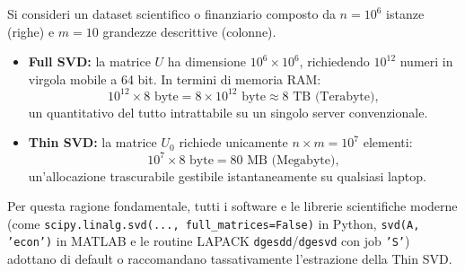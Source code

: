 \begin{table}[H]
\centering
{}
\caption{Confronto asintotico di occupazione spaziale e costo temporale tra Full SVD e Thin SVD.}
\label{tab:svd-full-vs-thin-complessita}
\end{table}

\begin{example}
Si consideri un dataset scientifico o finanziario composto da $n = 10^6$ istanze (righe) e $m = 10$ grandezze descrittive (colonne).
\begin{itemize}
    \item \textbf{Full SVD:} la matrice $U$ ha dimensione $10^6 \times 10^6$, richiedendo $10^{12}$ numeri in virgola mobile a 64 bit. In termini di memoria RAM:
    \begin{equation}
        10^{12} \times 8 \text{ byte} = 8 \times 10^{12} \text{ byte} \approx 8 \text{ TB (Terabyte)},
    \end{equation}
    un quantitativo del tutto intrattabile su un singolo server convenzionale.
    \item \textbf{Thin SVD:} la matrice $U_0$ richiede unicamente $n \times m = 10^7$ elementi:
    \begin{equation}
        10^7 \times 8 \text{ byte} = 80 \text{ MB (Megabyte)},
    \end{equation}
    un'allocazione trascurabile gestibile istantaneamente su qualsiasi laptop.
\end{itemize}
Per questa ragione fondamentale, tutti i software e le librerie scientifiche moderne (come \texttt{scipy.linalg.svd(..., full\_matrices=False)} in Python, \texttt{svd(A, 'econ')} in MATLAB e le routine LAPACK \texttt{dgesdd}/\texttt{dgesvd} con job \texttt{'S'}) adottano di default o raccomandano tassativamente l'estrazione della Thin SVD.
\end{example}

